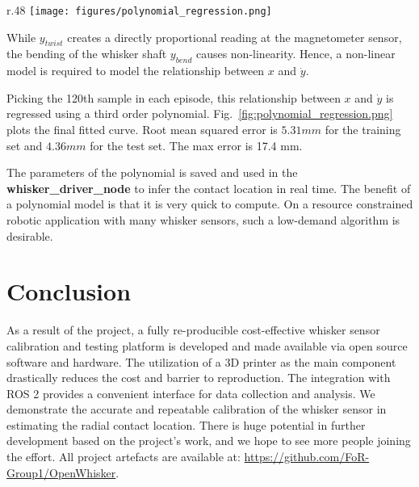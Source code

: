 \documentclass[runningheads]{llncs}
\begin{document}
\begin{wrapfigure}{r}{.48\textwidth}
    \centering
    \texttt{[image: figures/polynomial\_regression.png]}
    \caption{Polynomial Regression of the relationship 100th sample of \(\dot{y}\) in each episode and the contact distance \(x\)}
    \label{fig:polynomial_regression.png}
\end{wrapfigure}

While \(y_{twist}\) creates a directly proportional reading at the magnetometer sensor, the bending of the whisker shaft \(y_{bend}\) causes non-linearity. Hence, a non-linear model is required to model the relationship between \(x\) and \(\dot{y}\).

Picking the 120th sample in each episode, this relationship between \(x\) and \(\dot{y}\) is regressed using a third order polynomial. Fig.~\ref*{fig:polynomial_regression.png} plots the final fitted curve. Root mean squared error is $5.31 mm$ for the training set and $4.36 mm$ for the test set. The max error is 17.4 mm.

The parameters of the polynomial is saved and used in the \textbf{whisker\_driver\_node} to infer the contact location in real time. The benefit of a polynomial model is that it is very quick to compute. On a resource constrained robotic application with many whisker sensors, such a low-demand algorithm is desirable.

\section{Conclusion}

As a result of the project, a fully re-producible cost-effective whisker sensor calibration and testing platform is developed and made available via open source software and hardware. The utilization of a 3D printer as the main component drastically reduces the cost and barrier to reproduction. The integration with ROS 2 provides a convenient interface for data collection and analysis. We demonstrate the accurate and repeatable calibration of the whisker sensor in estimating the radial contact location. There is huge potential in further development based on the project's work, and we hope to see more people joining the effort. All project artefacts are available at: \url{https://github.com/FoR-Group1/OpenWhisker}.


\end{document}

